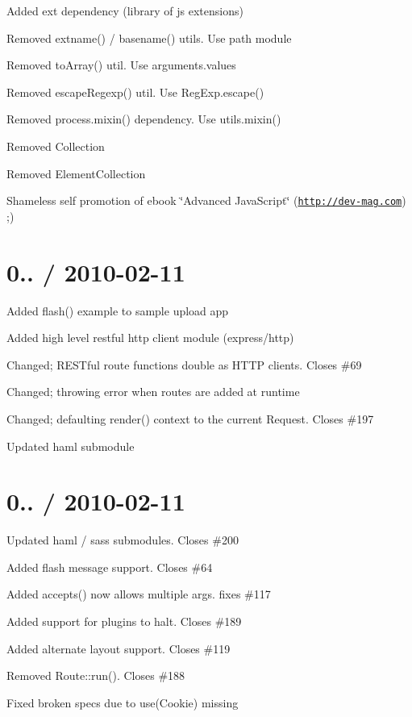 {\ttfamily }

{\ttfamily 
\begin{DoxyItemize}
\item Added ext dependency (library of js extensions)
\item Removed extname() / basename() utils. Use path module
\item Removed to\+Array() util. Use arguments.\+values
\item Removed escape\+Regexp() util. Use Reg\+Exp.\+escape()
\item Removed process.\+mixin() dependency. Use utils.\+mixin()
\item Removed Collection
\item Removed Element\+Collection
\item Shameless self promotion of ebook \char`\"{}\+Advanced Java\+Script\char`\"{} (\href{http://dev-mag.com}{\tt http\+://dev-\/mag.\+com}) ;)
\end{DoxyItemize}}

{\ttfamily \section*{0.. / 2010-\/02-\/11 }}

{\ttfamily }

{\ttfamily 
\begin{DoxyItemize}
\item Added flash() example to sample upload app
\item Added high level restful http client module (express/http)
\item Changed; R\+E\+S\+Tful route functions double as H\+T\+TP clients. Closes \#69
\item Changed; throwing error when routes are added at runtime
\item Changed; defaulting render() context to the current Request. Closes \#197
\item Updated haml submodule
\end{DoxyItemize}}

{\ttfamily \section*{0.. / 2010-\/02-\/11 }}

{\ttfamily }

{\ttfamily 
\begin{DoxyItemize}
\item Updated haml / sass submodules. Closes \#200
\item Added flash message support. Closes \#64
\item Added accepts() now allows multiple args. fixes \#117
\item Added support for plugins to halt. Closes \#189
\item Added alternate layout support. Closes \#119
\item Removed Route\+::run(). Closes \#188
\item Fixed broken specs due to use(\+Cookie) missing
\end{DoxyItemize}}

